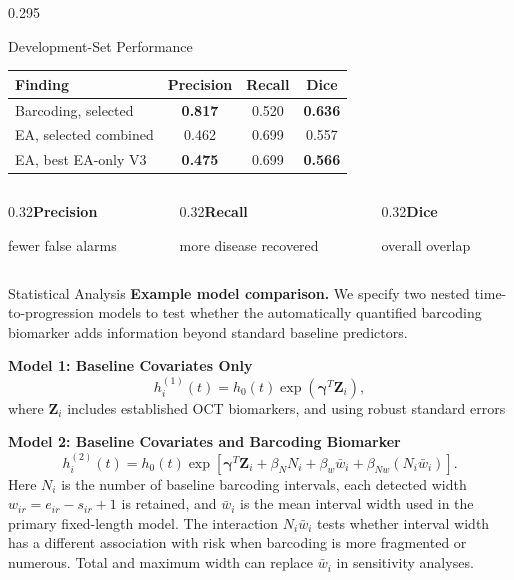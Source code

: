 \documentclass[final]{beamer}
\newcommand{\metric}[2]{\textbf{#1}\par{\fontsize{42}{45}\selectfont #2}}
\begin{document}
\begin{frame}[t]
\begin{columns}[t,totalwidth=\dimexpr\paperwidth-4cm\relax]
\begin{column}{0.295\textwidth}
\begin{block}{Development-Set Performance}
    \vspace{0.5cm}
    \centering
    \renewcommand{\arraystretch}{1.25}
    \begin{tabular}{lccc}
      \toprule
      \textbf{Finding} & \textbf{Precision} & \textbf{Recall} & \textbf{Dice}\\
      \midrule
      Barcoding, selected & \textbf{0.817} & 0.520 & \textbf{0.636}\\
      EA, selected combined & 0.462 & 0.699 & 0.557\\
      EA, best EA-only V3 & \textbf{0.475} & 0.699 & \textbf{0.566}\\
      \bottomrule
    \end{tabular}

    \vspace{0.6cm}
    \begin{columns}[c,totalwidth=\linewidth]
      \begin{column}{0.32\linewidth}\centering\metric{Precision}{fewer false alarms}\end{column}
      \begin{column}{0.32\linewidth}\centering\metric{Recall}{more disease recovered}\end{column}
      \begin{column}{0.32\linewidth}\centering\metric{Dice}{overall overlap}\end{column}
    \end{columns}
  \end{block}

  \begin{block}{Statistical Analysis}
    \textbf{Example model comparison.} We specify two nested
    time-to-progression models to test whether the
    automatically quantified barcoding biomarker adds information beyond
    standard baseline predictors.

    \vspace{0.35cm}
    \textbf{Model 1: Baseline Covariates Only}
    \[
      h_i^{(1)}(t)=h_0(t)\exp(\boldsymbol\gamma^T\mathbf Z_i),
    \]
    where $\mathbf Z_i$ includes established OCT biomarkers, and using robust standard errors

    \textbf{Model 2: Baseline Covariates and Barcoding Biomarker}
    \[
      h_i^{(2)}(t)=h_0(t)\exp\!\left[
      \boldsymbol\gamma^T\mathbf Z_i+
      \beta_NN_i+\beta_w\bar w_i+
      \beta_{Nw}(N_i\bar w_i)\right].
    \]
    Here $N_i$ is the number of baseline barcoding intervals, each detected
    width $w_{ir}=e_{ir}-s_{ir}+1$ is retained, and $\bar w_i$ is the mean
    interval width used in the primary fixed-length model. The interaction
    $N_i\bar w_i$ tests whether interval width has a different association
    with risk when barcoding is more fragmented or numerous. Total and maximum
    width can replace $\bar w_i$ in sensitivity analyses.


\end{block}
\end{column}
\end{columns}
\end{frame}
\end{document}
